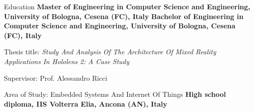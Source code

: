 \begin{rubric}{Education}
%
	\textbf{Master of Engineering in Computer Science and Engineering, University of Bologna, Cesena (FC), Italy}
%
\entry*[2018 -- 2021]%
	\textbf{Bachelor of Engineering in Computer Science and Engineering, University of Bologna, Cesena (FC), Italy}
	\par Thesis title: \emph{Study And Analysis Of The Architecture Of Mixed Reality Applications In Hololens 2: A Case Study}
	\par Supervisor: Prof. Alessandro Ricci
	\par Area of Study: Embedded Systems And Internet Of Things
% 
\entry*[2013 -- 2018]%
	\textbf{High school diploma, IIS Volterra Elia, Ancona (AN), Italy}
\end{rubric}
